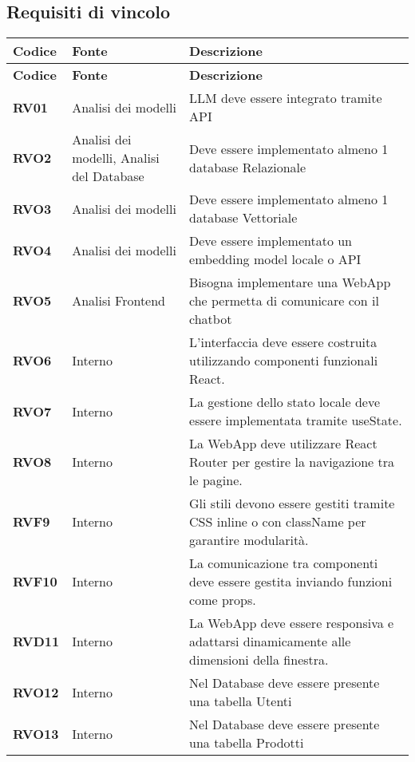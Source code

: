 \subsection{Requisiti di vincolo}
\begin{longtable}{|>{\centering\arraybackslash}m{}|>{\centering\arraybackslash}m{}|>{\centering\arraybackslash}m{}|}
	\hline
	\textbf{Codice} & \textbf{Fonte} & \textbf{Descrizione}\\\hline
	\endfirsthead
	\hline
	\textbf{Codice} & \textbf{Fonte} & \textbf{Descrizione}\\\hline
	\endhead
	\hline
	\textbf{RV01} & Analisi dei modelli    & LLM deve essere integrato tramite API\\
	\hline
	\textbf{RVO2} & Analisi dei modelli, Analisi del Database & Deve essere implementato almeno 1 database Relazionale\\
	\hline
	\textbf{RVO3} & Analisi dei modelli & Deve essere implementato almeno 1 database Vettoriale\\
	\hline
	\textbf{RVO4} & Analisi dei modelli & Deve essere implementato un embedding model locale o API\\
	\hline
	\textbf{RVO5} & Analisi Frontend & Bisogna implementare una WebApp che permetta di comunicare con il chatbot\\
	\hline
	\textbf{RVO6} & Interno & L’interfaccia deve essere costruita utilizzando componenti funzionali React.\\
	\hline
	\textbf{RVO7} & Interno & La gestione dello stato locale deve essere implementata tramite useState.\\
	\hline
	\textbf{RVO8} & Interno & La WebApp deve utilizzare React Router per gestire la navigazione tra le pagine.\\
	\hline
	\textbf{RVF9} & Interno & Gli stili devono essere gestiti tramite CSS inline o con className per garantire modularità.\\
	\hline
	\textbf{RVF10} & Interno & La comunicazione tra componenti deve essere gestita inviando funzioni come props.\\
	\hline
	\textbf{RVD11} & Interno & La WebApp deve essere responsiva e adattarsi dinamicamente alle dimensioni della finestra.\\
	\hline
	\textbf{RVO12} & Interno & Nel Database deve essere presente una tabella Utenti \\
	\hline
	\textbf{RVO13} & Interno & Nel Database deve essere presente una tabella Prodotti\\

\end{longtable}
